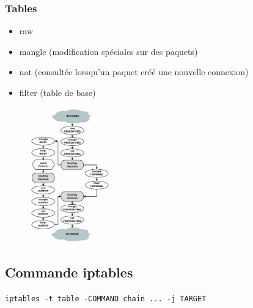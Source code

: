 \documentclass[resume]{subfiles}
\begin{document}
\subsubsection{Tables}
\begin{itemize}
\item raw
\item mangle (modification spéciales sur des paquets)
\item nat (consultée lorsqu'un paquet créé une nouvelle connexion)
\item filter (table de base)
\end{itemize}
\begin{figure}[H]
\centering
\includegraphics[width=3.50cm]{img_8.png}
\end{figure}
\subsection{Commande iptables}
\begin{center}
\verb!iptables -t table -COMMAND chain ... -j TARGET!
\end{center}
\end{document}
